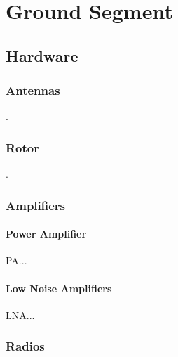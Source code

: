 %
%
%
%
%

%
%
%
%
%
%

\chapter{Ground Segment} \label{ch:ground-segment}

\section{Hardware}

\subsection{Antennas}

.

\subsection{Rotor}

.

\subsection{Amplifiers}

\subsubsection{Power Amplifier}

PA...

\subsubsection{Low Noise Amplifiers}

LNA...

\subsection{Radios}

